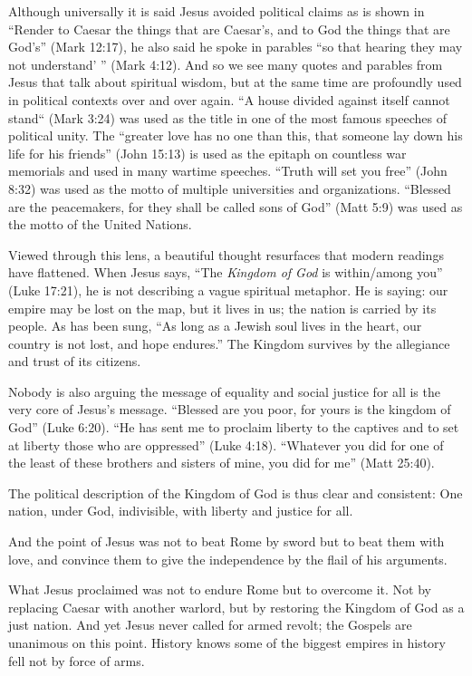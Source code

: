 Although universally it is said Jesus avoided political claims as is shown in ``Render to Caesar the things that are Caesar's, and to God the things that are God's'' (Mark 12:17), he also said he spoke in parables ``so that hearing they may not understand' '' (Mark 4:12).
And so we see many quotes and parables from Jesus that talk about spiritual wisdom, but at the same time are profoundly used in political contexts over and over again.
``A house divided against itself cannot stand`` (Mark 3:24) was used as the title in one of the most famous speeches of political unity.
The ``greater love has no one than this, that someone lay down his life for his friends'' (John 15:13) is used as the epitaph on countless war memorials and used in many wartime speeches.
``Truth will set you free'' (John 8:32) was used as the motto of multiple universities and organizations.
``Blessed are the peacemakers, for they shall be called sons of God'' (Matt 5:9) was used as the motto of the United Nations.

Viewed through this lens, a beautiful thought resurfaces that modern readings have flattened.
When Jesus says, ``The \emph{Kingdom of God} is within/among you'' (Luke 17:21), he is not describing a vague spiritual metaphor.
He is saying: our empire may be lost on the map, but it lives in us; the nation is carried by its people.
As has been sung, ``As long as a Jewish soul lives in the heart, our country is not lost, and hope endures.''
The Kingdom survives by the allegiance and trust of its citizens.

Nobody is also arguing the message of equality and social justice for all is the very core of Jesus’s message.
“Blessed are you poor, for yours is the kingdom of God” (Luke 6:20).
“He has sent me to proclaim liberty to the captives and to set at liberty those who are oppressed” (Luke 4:18).
“Whatever you did for one of the least of these brothers and sisters of mine, you did for me” (Matt 25:40).

The political description of the Kingdom of God is thus clear and consistent:
One nation, under God, indivisible, with liberty and justice for all.

And the point of Jesus was not to beat Rome by sword but to beat them with love,
and convince them to give the independence by the flail of his arguments.

What Jesus proclaimed was not to endure Rome but to overcome it.
Not by replacing Caesar with another warlord, but by restoring the Kingdom of God as a just nation.
And yet Jesus never called for armed revolt; the Gospels are unanimous on this point.
History knows some of the biggest empires in history fell not by force of arms.

